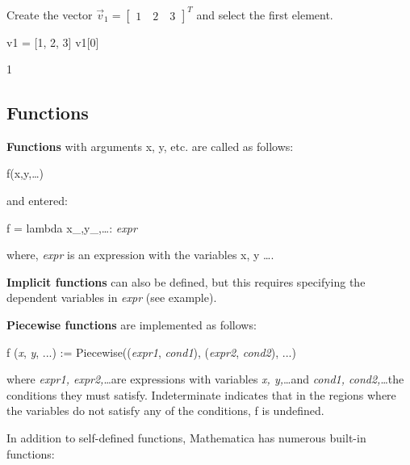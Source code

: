 \begin{example}

Create the vector $\vec{v}_1=\begin{bmatrix}1\quad2\quad3\end{bmatrix}^T$ and select the first element.
	
\begin{pyin}
v1 = [1, 2, 3]
v1[0]
\end{pyin}
\begin{pyout}
1
\end{pyout}
\end{example}

\subsection{Functions}
\textbf{Functions} with arguments x, y, etc. are called as follows:

\begin{center}
	f(x,y,\ldots)
\end{center}

and entered:

\begin{center}
	f = lambda x\_,y\_,\ldots : \textit{expr}
\end{center}


where, \textit{expr} is an expression with the variables x, y \ldots .

\textbf{Implicit functions} can also be defined, but this requires specifying the dependent variables in \textit{expr} (see example).

\textbf{Piecewise functions} are implemented as follows:

\begin{center}
	f (\textit{x}\textunderscore ,\textit{ y}\textunderscore, ...) :=  Piecewise((\textit{expr1}, \textit{cond1}), (\textit{expr2}, \textit{cond2}), ...)
\end{center}


where \textit{expr1, expr2,}\ldots  are expressions with variables \textit{x, y,}\ldots and \textit{cond1, cond2,}\ldots the conditions they must satisfy. Indeterminate indicates that in the regions where the variables do not satisfy any of the conditions, f is undefined.
   
In addition to self-defined functions, Mathematica has numerous built-in functions:

